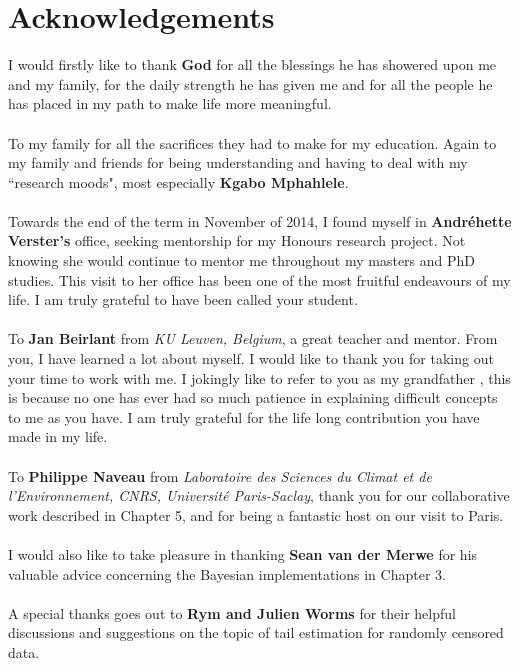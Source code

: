 \chapter*{Acknowledgements}
\thispagestyle{empty}
I would firstly like to thank \textbf{God} for all the blessings he has showered upon me and my family, for the daily strength he has given me and for all the people he has placed in my path to make life more meaningful.
\\\\
To my family for all the sacrifices they had to make for my education. Again to my family and friends for being understanding and having to deal with my ``research moods", most especially \textbf{Kgabo Mphahlele}.
\\\\
Towards the end of the term in November of 2014, I found myself in \textbf{Andréhette Verster's} office, seeking mentorship for my Honours research project. Not knowing she would continue to mentor me throughout my masters and PhD studies. This visit to her office has been one of the most fruitful endeavours of my life. I am truly grateful to have been called your student.
\\\\
To \textbf{Jan Beirlant} from {\it KU Leuven, Belgium}, a great teacher and mentor. From you, I have learned a lot about myself. I would like to thank you for taking out your time to work with me. I jokingly like to refer to you as my grandfather \smiley{}, this is because no one has ever had so much patience in explaining difficult concepts to me as you have. I am truly grateful for the life long contribution you have made in my life.
\\\\
To \textbf{Philippe Naveau} from \textit{Laboratoire des Sciences du Climat et de l'Environnement, CNRS, Université Paris-Saclay}, thank you for our collaborative work described in Chapter 5, and for being a fantastic host on our visit to Paris.
\\\\
I would also like to take pleasure in thanking \textbf{Sean van der Merwe} for his valuable advice concerning the Bayesian implementations in Chapter 3.
\\\\
A special thanks goes out to \textbf{Rym and Julien Worms} for their helpful discussions and suggestions on the topic of tail estimation for randomly censored data. 
\\\\
